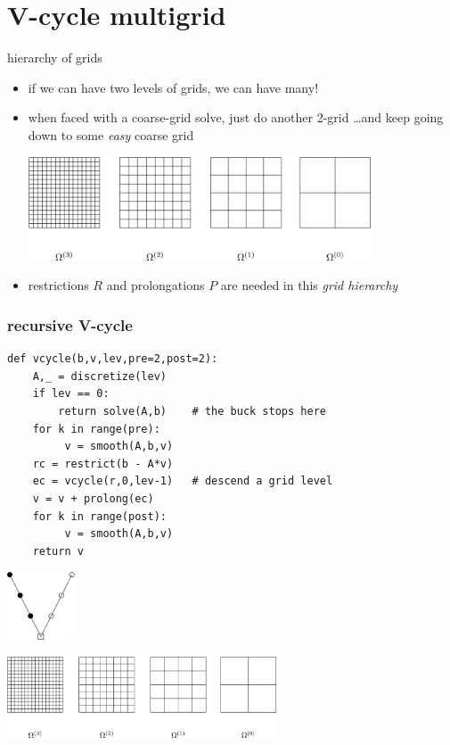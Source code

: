 \documentclass[10pt,
               svgnames,
               hyperref={colorlinks,citecolor=DeepPink4,linkcolor=FireBrick,urlcolor=Maroon},
               usepdftitle=false]{beamer}
\begin{document}
\section{V-cycle multigrid}

\begin{frame}{hierarchy of grids}
\begin{itemize}
\item if we can have two levels of grids, we can have many!
\item when faced with a coarse-grid solve, just do another 2-grid \dots and keep going down to some \emph{easy} coarse grid

\bigskip\medskip
\hfill \includegraphics[width=0.8\textwidth]{images/multigrid-grids.png}

\medskip
\item restrictions $R$ and prolongations $P$ are needed in this \emph{grid hierarchy}

\end{itemize}
\end{frame}


\begin{frame}[fragile]
\frametitle{recursive V-cycle}
\begin{verbatim}
def vcycle(b,v,lev,pre=2,post=2):
    A,_ = discretize(lev)
    if lev == 0:
        return solve(A,b)    # the buck stops here
    for k in range(pre):
         v = smooth(A,b,v)
    rc = restrict(b - A*v)
    ec = vcycle(r,0,lev-1)   # descend a grid level
    v = v + prolong(ec)
    for k in range(post):
         v = smooth(A,b,v)
    return v
\end{verbatim}

\vspace{-5mm}
\hfill \includegraphics[width=0.15\textwidth]{images/vcycle.png}

\vspace{-8mm}
\hspace{5mm} \includegraphics[width=0.6\textwidth]{images/multigrid-grids.png}
\end{frame}
\end{document}
